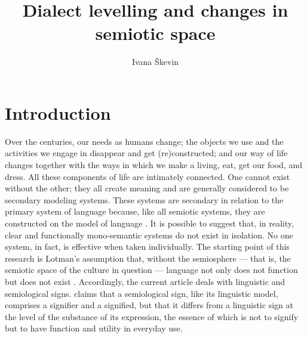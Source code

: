 \documentclass[output=paper]{LSP/langsci}
\author{Ivana Škevin\affiliation{University of Zadar}}
\title{Dialect levelling and changes in semiotic space}
\begin{document}
 

 

\section{Introduction}
Over the centuries, our needs as humans change; the objects we use and the activities we engage in disappear and get (re)constructed; and our way of life changes together with the ways in which we make a living, eat, get our food, and dress. All these components of life are intimately connected. One cannot exist without the other; they all create meaning and are generally considered to be secondary modeling systems. These systems are secondary in relation to the primary system of language because, like all semiotic systems, they are constructed on the model of language \citep[viii]{lotman_culture_2009}. It is possible to suggest that, in reality, clear and functionally mono-semantic systems do not exist in isolation. No one system, in fact, is effective when taken individually. The starting point of this research is Lotman's assumption that, without the semiosphere — that is, the semiotic space of the culture in question — language not only does not function but does not exist \citep[218--219]{lotman_semiosphere_1985}. Accordingly, the current article deals with linguistic and semiological signs. \citet[41]{barthes_elements_1968} claims that a semiological sign, like its linguistic model, comprises a signifier and a signified, but that it differs from a linguistic sign at the level of the substance of its expression, the essence of which is not to signify but to have function and utility in everyday use. 
\end{document}
